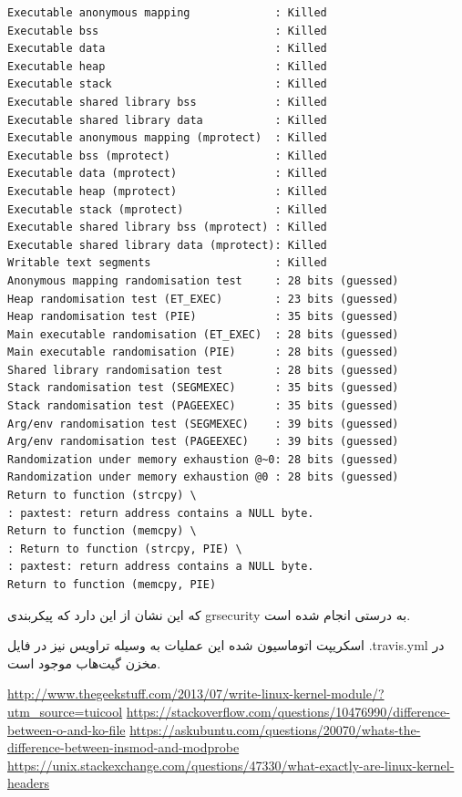 \documentclass{article}
\begin{document}
\begin{enumerate}
\begin{latin}
\begin{verbatim}
Executable anonymous mapping             : Killed
Executable bss                           : Killed
Executable data                          : Killed
Executable heap                          : Killed
Executable stack                         : Killed
Executable shared library bss            : Killed
Executable shared library data           : Killed
Executable anonymous mapping (mprotect)  : Killed
Executable bss (mprotect)                : Killed
Executable data (mprotect)               : Killed
Executable heap (mprotect)               : Killed
Executable stack (mprotect)              : Killed
Executable shared library bss (mprotect) : Killed
Executable shared library data (mprotect): Killed
Writable text segments                   : Killed
Anonymous mapping randomisation test     : 28 bits (guessed)
Heap randomisation test (ET_EXEC)        : 23 bits (guessed)
Heap randomisation test (PIE)            : 35 bits (guessed)
Main executable randomisation (ET_EXEC)  : 28 bits (guessed)
Main executable randomisation (PIE)      : 28 bits (guessed)
Shared library randomisation test        : 28 bits (guessed)
Stack randomisation test (SEGMEXEC)      : 35 bits (guessed)
Stack randomisation test (PAGEEXEC)      : 35 bits (guessed)
Arg/env randomisation test (SEGMEXEC)    : 39 bits (guessed)
Arg/env randomisation test (PAGEEXEC)    : 39 bits (guessed)
Randomization under memory exhaustion @~0: 28 bits (guessed)
Randomization under memory exhaustion @0 : 28 bits (guessed)
Return to function (strcpy) \
: paxtest: return address contains a NULL byte.
Return to function (memcpy) \
: Return to function (strcpy, PIE) \
: paxtest: return address contains a NULL byte.
Return to function (memcpy, PIE)

\end{verbatim}
\end{latin}
که این نشان از این دارد که پیکربندی grsecurity به درستی انجام شده است.

\end{enumerate}

اسکریپت اتوماسیون شده این عملیات به وسیله تراویس نیز در فایل .travis.yml در مخزن گیت‌هاب موجود است.


\begin{thebibliography}{9}

\latin
{}
\url{http://www.thegeekstuff.com/2013/07/write-linux-kernel-module/?utm_source=tuicool}
\url{https://stackoverflow.com/questions/10476990/difference-between-o-and-ko-file}
\bibitem{3}
\url{https://askubuntu.com/questions/20070/whats-the-difference-between-insmod-and-modprobe}
\bibitem{4}
\url{https://unix.stackexchange.com/questions/47330/what-exactly-are-linux-kernel-headers}

\end{thebibliography}
\end{document}
